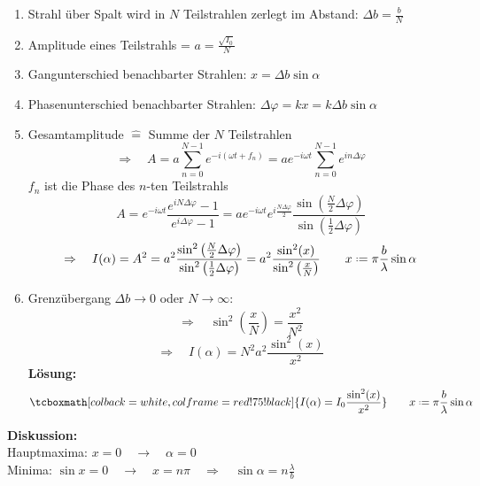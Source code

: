 \documentclass[titlepage,11pt,a4paper,ngerman]{report}
\newcommand*{\defeq}{\mathrel{\vcenter{\baselineskip0.5ex \lineskiplimit0pt \hbox{\scriptsize.}\hbox{\scriptsize.}}}=}
\newcommand{\rmbox}[1]{\tcboxmath[colback=white,colframe=red!75!black]{#1}}
\begin{document}
\begin{enumerate}[(1)]
	\item Strahl über Spalt wird in $ N $ Teilstrahlen zerlegt im Abstand: $ \Delta b = \frac{b}{N} $
	\item Amplitude eines Teilstrahls = $ a = \frac{\sqrt{I_0}}{N} $
	\item Gangunterschied benachbarter Strahlen: $ x = \Delta b \sin \alpha $
	\item Phasenunterschied benachbarter Strahlen: $ \Delta \varphi = k x = k \Delta b \sin \alpha  $
	\item Gesamtamplitude $ \widehat{=} $ Summe der $ N $ Teilstrahlen
	\begin{equation*}
	\Rightarrow \quad A = a \sum_{n=0}^{N-1} e^{-i(\omega t + f_n)} = a e^{-i \omega t} \sum_{n=0}^{N-1} e^{i n \Delta \varphi}
	\end{equation*}
	$ f_n $ ist die Phase des $ n $-ten Teilstrahls
	\begin{equation*}
	A = e^{-i\omega t} \frac{e^{i N \Delta \varphi}-1}{e^{i \Delta \varphi}-1} = a e^{- i \omega t} e^{i \frac{N \Delta \varphi}{2}} \frac{\sin\left(\frac{N}{2} \Delta \varphi\right)}{\sin\left(\frac{1}{2} \Delta \varphi\right)}
	\end{equation*}
	\begin{equation*}
	\Rightarrow \quad I(\alpha) = A^2 = a^2 \frac{\sin^2\left(\frac{N}{2} \Delta \varphi \right)}{\sin^2 \left(\frac{1}{2} \Delta \varphi \right)} = a^2 \frac{\sin^2 (x)}{\sin^2 \left(\frac{x}{N}\right)} \qquad x \defeq \pi \frac{b}{\lambda} \sin \alpha
	\end{equation*}
	\item Grenzübergang $ \Delta b \rightarrow 0 $ oder $ N \rightarrow \infty $:
	\begin{equation*}
	\Rightarrow \quad \sin^2(\frac{x}{N}) = \frac{x^2}{N^2}
	\end{equation*}
	\begin{equation*}
	\Rightarrow \quad I(\alpha)  = N^2 a^2 \frac{\sin^2(x)}{x^2}
	\end{equation*}
	\textbf{Lösung:}
	\begin{equation*}
	\rmbox{I(\alpha) = I_0 \frac{\sin^2(x)}{x^2}} \qquad x \defeq \pi \frac{b}{\lambda} \sin \alpha
	\end{equation*}
\end{enumerate}
\textbf{Diskussion:}\\[5pt]
Hauptmaxima: $ x = 0 \quad \rightarrow \quad \alpha = 0 $\\
Minima: $ \sin x = 0 \quad \rightarrow \quad x = n \pi \quad \Rightarrow \quad \sin \alpha = n \frac{\lambda}{b} $\\
\end{document}
